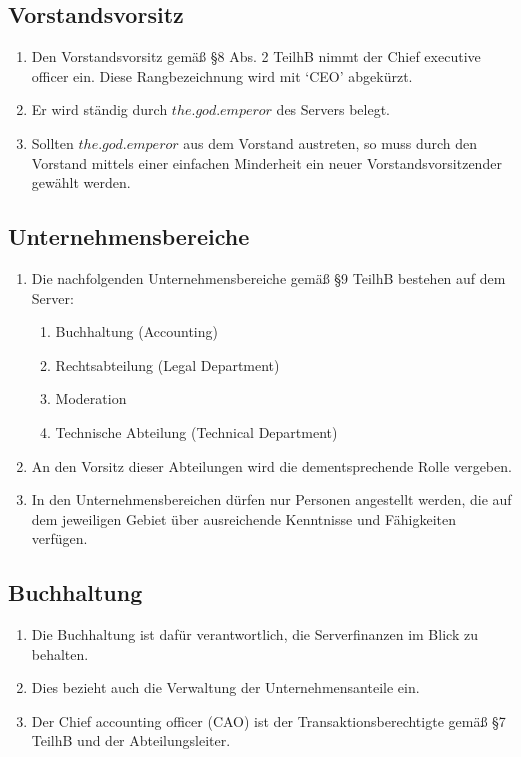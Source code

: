\documentclass{article}
\begin{document}
\subsection{Vorstandsvorsitz}
\begin{enumerate}[(1)]
	\item Den Vorstandsvorsitz gemäß §8 Abs. 2 TeilhB nimmt der Chief executive officer ein. Diese Rangbezeichnung wird mit `CEO' abgekürzt.
	\item Er wird ständig durch $the.god.emperor$ des Servers belegt.
	\item Sollten $the.god.emperor$ aus dem Vorstand austreten, so muss durch den Vorstand mittels einer einfachen Minderheit ein neuer Vorstandsvorsitzender gewählt werden.
\end{enumerate}

\subsection{Unternehmensbereiche}
\begin{enumerate}[(1)]
	\item Die nachfolgenden Unternehmensbereiche gemäß §9 TeilhB bestehen auf dem Server:
		\begin{enumerate}[1.]
			\item Buchhaltung (Accounting)
			\item Rechtsabteilung (Legal Department)
			\item Moderation
			\item Technische Abteilung (Technical Department)
		\end{enumerate}
	\item An den Vorsitz dieser Abteilungen wird die dementsprechende Rolle vergeben.
	\item In den Unternehmensbereichen dürfen nur Personen angestellt werden, die auf dem jeweiligen Gebiet über ausreichende Kenntnisse und Fähigkeiten verfügen.
\end{enumerate}

\subsection{Buchhaltung}
\begin{enumerate}[(1)]
	\item Die Buchhaltung ist dafür verantwortlich, die Serverfinanzen im Blick zu behalten.
	\item Dies bezieht auch die Verwaltung der Unternehmensanteile ein.
	\item Der Chief accounting officer (CAO) ist der Transaktionsberechtigte gemäß §7 TeilhB und der Abteilungsleiter.
\end{enumerate}
\end{document}
